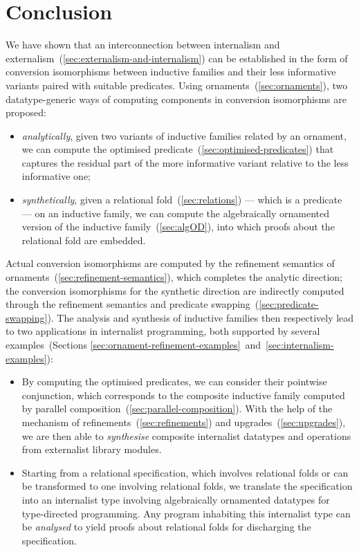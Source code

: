 \chapter{Conclusion}
\label{chap:conclusion}

We have shown that an interconnection between internalism and externalism~(\autoref{sec:externalism-and-internalism}) can be established in the form of conversion isomorphisms between inductive families and their less informative variants paired with suitable predicates.
Using ornaments~(\autoref{sec:ornaments}), two datatype-generic ways of computing components in conversion isomorphisms are proposed:
\begin{itemize}
\item \emph{analytically}, given two variants of inductive families related by an ornament, we can compute the optimised predicate~(\autoref{sec:optimised-predicates}) that captures the residual part of the more informative variant relative to the less informative one;
\item \emph{synthetically}, given a relational fold~(\autoref{sec:relations}) --- which is a predicate --- on an inductive family, we can compute the algebraically ornamented version of the inductive family~(\autoref{sec:algOD}), into which proofs about the relational fold are embedded.
\end{itemize}
Actual conversion isomorphisms are computed by the refinement semantics of ornaments~(\autoref{sec:refinement-semantics}), which completes the analytic direction; the conversion isomorphisms for the synthetic direction are indirectly computed through the refinement semantics and predicate swapping~(\autoref{sec:predicate-swapping}).
The analysis and synthesis of inductive families then respectively lead to two applications in internalist programming, both supported by several examples~(Sections \ref{sec:ornament-refinement-examples}~and~\ref{sec:internalism-examples}):
\begin{itemize}
\item By computing the optimised predicates, we can consider their pointwise conjunction, which corresponds to the composite inductive family computed by parallel composition~(\autoref{sec:parallel-composition}).
With the help of the mechanism of refinements~(\autoref{sec:refinements}) and upgrades~(\autoref{sec:upgrades}), we are then able to \emph{synthesise} composite internalist datatypes and operations from externalist library modules.
\item Starting from a relational specification, which involves relational folds or can be transformed to one involving relational folds, we translate the specification into an internalist type involving algebraically ornamented datatypes for type-directed programming.
Any program inhabiting this internalist type can be \emph{analysed} to yield proofs about relational folds for discharging the specification.
\end{itemize}
